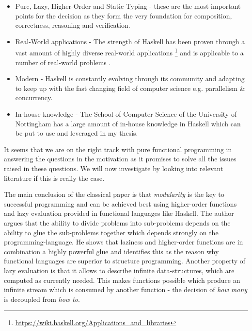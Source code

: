 \begin{itemize}
	\item Pure, Lazy, Higher-Order and Static Typing - these are the most important points for the decision as they form the very foundation for composition, correctness, reasoning and verification. 
	\item Real-World applications - The strength of Haskell has been proven through a vast amount of highly diverse real-world applications \footnote{\url{https://wiki.haskell.org/Applications_and_libraries}} \cite{hudak_history_2007} and is applicable to a number of real-world problems \cite{osullivan_real_2008}.
	\item Modern - Haskell is constantly evolving through its community and adapting to keep up with the fast changing field of computer science e.g. parallelism \& concurrency.
	\item In-house knowledge - The School of Computer Science of the University of Nottingham has a large amount of in-house knowledge in Haskell which can be put to use and leveraged in my thesis.
\end{itemize}

It seems that we are on the right track with pure functional programming in answering the questions in the motivation as it promises to solve all the issues raised in these questions. We will now investigate by looking into relevant literature if this is really the case. 

The main conclusion of the classical paper \cite{hughes_why_1989} is that \textit{modularity} is the key to successful programming and can be achieved best using higher-order functions and lazy evaluation provided in functional languages like Haskell. The author argues that the ability to divide problems into sub-problems depends on the ability to glue the sub-problems together which depends strongly on the programming-language. He shows that laziness and higher-order functions are in combination a highly powerful glue and identifies this as the reason why functional languages are superior to structure programming. Another property of lazy evaluation is that it allows to describe infinite data-structures, which are computed as currently needed. This makes functions possible which produce an infinite stream which is consumed by another function - the decision of \textit{how many} is decoupled from \textit{how to}.


